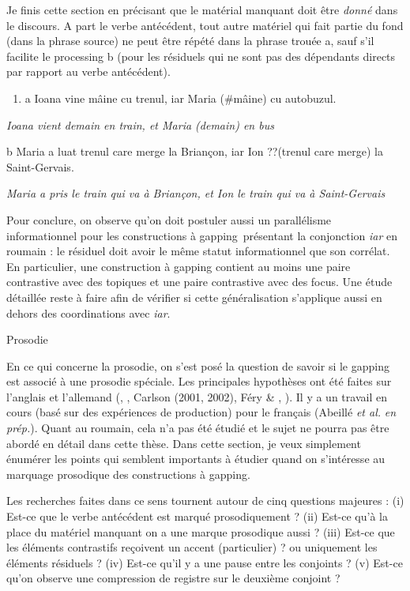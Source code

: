 Je finis cette section en précisant que le matérial manquant doit être \textit{donné} dans le discours. A part le verbe antécédent, tout autre matériel qui fait partie du fond (dans la phrase source) ne peut être répété dans la phrase trouée a, sauf s'il facilite le processing b (pour les résiduels qui ne sont pas des dépendants directs par rapport au verbe antécédent). 


\begin{enumerate}
\item \label{bkm:Ref289690938}a  Ioana vine mâine cu trenul, iar Maria (\#mâine) cu autobuzul.


\end{enumerate}
{\itshape
Ioana vient demain en train, et Maria (demain) en bus} 

  b  Maria a luat trenul care merge la Briançon, iar Ion ??(trenul care merge) la Saint-Gervais. 

{\itshape
Maria a pris le train qui va à Briançon, et Ion le train qui va à Saint-Gervais}

Pour conclure, on observe qu'on doit postuler aussi un parallélisme informationnel pour les constructions à gapping~présentant la conjonction \textit{iar} en roumain : le résiduel doit avoir le même statut informationnel que son corrélat. En particulier, une construction à gapping contient au moins une paire contrastive avec des topiques et une paire contrastive avec des focus. Une étude détaillée reste à faire afin de vérifier si cette généralisation s'applique aussi en dehors des coordinations avec \textit{iar}.  

Prosodie

En ce qui concerne la prosodie, on s'est posé la question de savoir si le gapping est associé à une prosodie spéciale. Les principales hypothèses ont été faites sur l'anglais et l'allemand (\citet{Hartmann2000}, \citet{Schwarz2000}, Carlson (2001, 2002), Féry \& \citet{Hartmann2005}, \citet{Winkler2005}). Il y a un travail en cours (basé sur des expériences de production) pour le français (Abeillé \textit{et al.} \textit{en prép.}). Quant au roumain, cela n'a pas été étudié et le sujet ne pourra pas être abordé en détail dans cette thèse. Dans cette section, je veux simplement énumérer les points qui semblent importants à étudier quand on s'intéresse au marquage prosodique des constructions à gapping.

Les recherches faites dans ce sens tournent autour de cinq questions majeures : (i) Est-ce que le verbe antécédent est marqué prosodiquement ? (ii) Est-ce qu'à la place du matériel manquant on a une marque prosodique aussi ? (iii) Est-ce que les éléments contrastifs reçoivent un accent (particulier) ? ou uniquement les éléments résiduels ? (iv) Est-ce qu'il y a une pause entre les conjoints ? (v) Est-ce qu'on observe une compression de registre sur le deuxième conjoint ?

